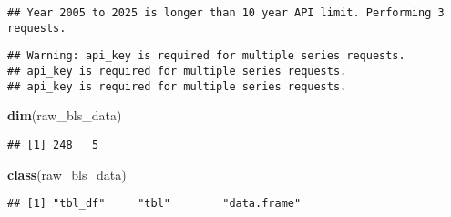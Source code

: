 \documentclass[
]{article}
\newenvironment{Shaded}{\begin{snugshade}}{\end{snugshade}}
\newcommand{\FunctionTok}[1]{\textcolor[rgb]{0.13,0.29,0.53}{\textbf{#1}}}
\newcommand{\NormalTok}[1]{#1}
\begin{document}
\begin{verbatim}
## Year 2005 to 2025 is longer than 10 year API limit. Performing 3 requests.
\end{verbatim}

\begin{verbatim}
## Warning: api_key is required for multiple series requests.
## api_key is required for multiple series requests.
## api_key is required for multiple series requests.
\end{verbatim}

\begin{Shaded}
\begin{Highlighting}[]
\FunctionTok{dim}\NormalTok{(raw\_bls\_data)}
\end{Highlighting}
\end{Shaded}

\begin{verbatim}
## [1] 248   5
\end{verbatim}

\begin{Shaded}
\begin{Highlighting}[]
\FunctionTok{class}\NormalTok{(raw\_bls\_data)}
\end{Highlighting}
\end{Shaded}

\begin{verbatim}
## [1] "tbl_df"     "tbl"        "data.frame"
\end{verbatim}
\end{document}
